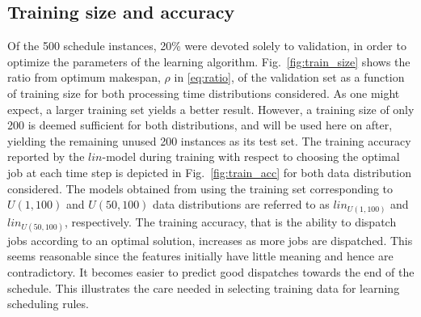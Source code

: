 \documentclass[10pt]{llncs}
\begin{document}

\subsection{Training size and accuracy}\label{sec:Expr:Train}

Of the 500 schedule instances, 20\% were devoted solely to validation, in order to optimize the parameters of the learning algorithm. Fig.~\ref{fig:train_size} shows the ratio from optimum makespan, $\rho$ in \eqref{eq:ratio}, of the validation set as a function of training size for both processing time distributions considered. As one might expect, a larger training set yields a better result. However, a training size of only 200 is deemed sufficient for both distributions, and will be used here on after, yielding the remaining unused 200 instances as its test set. The training accuracy reported by the $lin$-model during training with respect to choosing the optimal job at each time step is depicted in Fig.~\ref{fig:train_acc} for both data distribution considered. The models obtained from using the training set corresponding to  $U(1,100)$ and $U(50,100)$ data distributions are referred to as $lin_{U(1,100)}$ and $lin_{U(50,100)}$, respectively. 
The training accuracy, that is the ability to dispatch jobs according to an optimal solution, increases as more jobs are dispatched. This seems reasonable since the features initially have little meaning and hence are contradictory. It becomes easier to predict good dispatches towards the end of the schedule. This illustrates the care needed in selecting training data for learning scheduling rules. %
\end{document}

